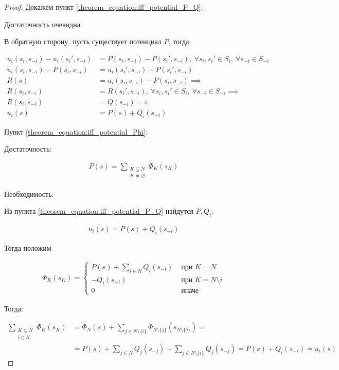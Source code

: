 \begin{proof}
	Докажем пункт \eqref{theorem_equation:iff_potential_P_Q}:

	Достаточность очевидна.

	В обратную сторону, пусть существует потенциал $P$, тогда:

	\begin{align*}
		u_i(s_i, s_{-i}) - u_i(s_i', s_{-i}) &= P(s_i, s_{-i}) - P(s_i', s_{-i}), \ \forall s_i, s_i' \in S_i, \ \forall s_{-i} \in S_{-i} \\
		u_i(s_i, s_{-i}) - P(s_i, s_{-i}) &= u_i(s_i', s_{-i}) - P(s_i', s_{-i})\\
		R(s) &= u_i(s_i, s_{-i}) - P(s_i, s_{-i}) \implies \\
		R(s_i, s_{-i}) &= R(s_i', s_{-i}), \ \forall s_i, s_i' \in S_i, \ \forall s_{-i} \in S_{-i} \implies \\
		R(s_i, s_{-i}) &= Q(s_{-i}) \implies \\
		u_i(s) &= P(s) + Q_i(s_{-i})
	\end{align*}

	Пункт \eqref{theorem_equation:iff_potential_Phi}:

	Достаточность:

	\begin{align*}
		P(s) = \sum_{\substack{K \subseteq N \\ K \neq \varnothing}} \Phi_K(s_K)
	\end{align*}

	Необходимость:

	Из пункта \eqref{theorem_equation:iff_potential_P_Q} найдутся $P, Q_i$:

	 \begin{align*}
		 u_i(s) = P(s) + Q_i(s_{-i})
	\end{align*}

	Тогда положим 

	\begin{align*}
		\Phi_K(s_K) = \begin{cases}
			P(s) + \sum_{i \in N} Q_i(s_{-i}) &\text{ при } K = N \\
			-Q_i(s_{-i}) &\text{ при } K = N \setminus{i} \\
			0 &\text{ иначе}
		\end{cases}
	\end{align*}

	Тогда:

	\begin{align*}
		\sum_{\substack{K \subseteq N \\ i \in K}} \Phi_K(s_K) &= \Phi_N(s) + \sum_{j \in N \setminus \{i\}} \Phi_{N \setminus \{j\}} (s_{N \setminus \{j\}}) = \\
															   &= P(s) + \sum_{j \in N} Q_j(s_{-j}) - \sum_{j \in N \setminus \{i\}} Q_{j}(s_{-j}) = P(s) + Q_i(s_{-i}) = u_i(s)
	\end{align*}

\end{proof}

